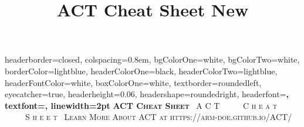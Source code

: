 \documentclass[potrait, z1paper, fontscale=0.33]{baposter} %
\title{ACT Cheat Sheet New}
\begin{document}
\begin{poster}
{
headerborder=closed, %
colspacing=0.8em, %
bgColorOne=white, %
bgColorTwo=white, %
borderColor=lightblue, %
headerColorOne=black, %
headerColorTwo=lightblue, %
headerFontColor=white, %
boxColorOne=white, %
textborder=roundedleft, %
eyecatcher=true, %
headerheight=0.06\textheight, %
headershape=roundedright, %
headerfont=\Large\bf\textsc, %
textfont={\setlength{\parindent}{1.5em}}, %
linewidth=2pt %
}
{\bf\textsc{ACT Cheat Sheet}\vspace{0.5em}} %
{\textsc{\ A C T \ \ \ \ \ C h e a t \ \ \ \ \ S h e e t\ \hspace{12pt}}}
{\textsc{Learn More About ACT at https://arm-doe.github.io/ACT/ \hspace{12pt}}} 



\end{poster}
\end{document}
